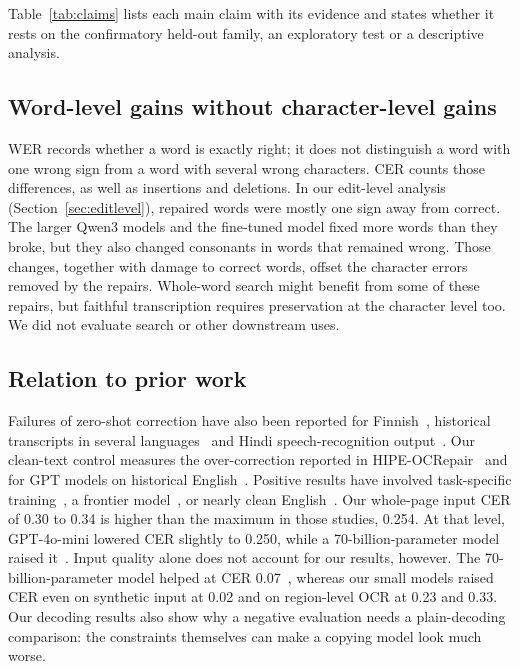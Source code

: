 \documentclass[conference]{IEEEtran}
\begin{document}
Table~\ref{tab:claims} lists each main claim with its evidence and states whether it rests on the confirmatory held-out family, an exploratory test or a descriptive analysis.



\subsection{Word-level gains without character-level gains}
WER records whether a word is exactly right; it does not distinguish a word with one wrong sign from a word with several wrong characters. CER counts those differences, as well as insertions and deletions. In our edit-level analysis (Section~\ref{sec:editlevel}), repaired words were mostly one sign away from correct. The larger Qwen3 models and the fine-tuned model fixed more words than they broke, but they also changed consonants in words that remained wrong. Those changes, together with damage to correct words, offset the character errors removed by the repairs. Whole-word search might benefit from some of these repairs, but faithful transcription requires preservation at the character level too. We did not evaluate search or other downstream uses.

\subsection{Relation to prior work}
Failures of zero-shot correction have also been reported for Finnish~\cite{kanerva2025nofreelunches}, historical transcripts in several languages~\cite{boros2024postcorrection} and Hindi speech-recognition output~\cite{kumar2026postasr}. Our clean-text control measures the over-correction reported in HIPE-OCRepair~\cite{ehrmann2026hipeocrepair} and for GPT models on historical English~\cite{zhang2024prosody}. Positive results have involved task-specific training~\cite{thomas2024leveraging,ehrmann2026hipeocrepair}, a frontier model~\cite{viana2026reframing}, or nearly clean English~\cite{koynov2025opportunities}. Our whole-page input CER of 0.30 to 0.34 is higher than the maximum in those studies, 0.254. At that level, GPT-4o-mini lowered CER slightly to 0.250, while a 70-billion-parameter model raised it~\cite{koynov2025opportunities}. Input quality alone does not account for our results, however. The 70-billion-parameter model helped at CER 0.07~\cite{koynov2025opportunities}, whereas our small models raised CER even on synthetic input at 0.02 and on region-level OCR at 0.23 and 0.33. Our decoding results also show why a negative evaluation needs a plain-decoding comparison: the constraints themselves can make a copying model look much worse.
\end{document}
